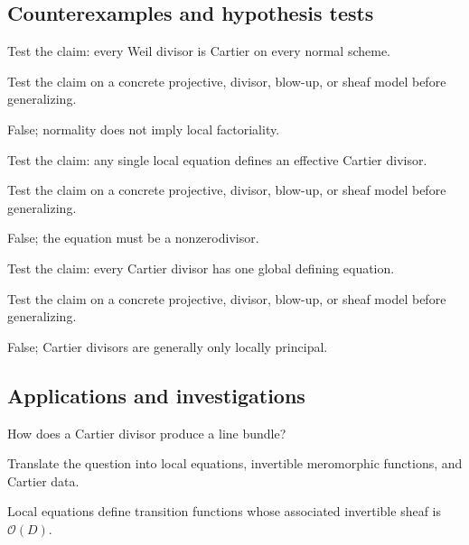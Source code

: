 \subsection*{Counterexamples and hypothesis tests}

\begin{exercise}\label{exr:vi40-expand-10}
Test the claim: every Weil divisor is Cartier on every normal scheme.
\end{exercise}
\begin{hint}
Test the claim on a concrete projective, divisor, blow-up, or sheaf model before generalizing.
\end{hint}
\begin{solution}
False; normality does not imply local factoriality.
\end{solution}

\begin{exercise}\label{exr:vi40-expand-11}
Test the claim: any single local equation defines an effective Cartier divisor.
\end{exercise}
\begin{hint}
Test the claim on a concrete projective, divisor, blow-up, or sheaf model before generalizing.
\end{hint}
\begin{solution}
False; the equation must be a nonzerodivisor.
\end{solution}

\begin{exercise}\label{exr:vi40-expand-12}
Test the claim: every Cartier divisor has one global defining equation.
\end{exercise}
\begin{hint}
Test the claim on a concrete projective, divisor, blow-up, or sheaf model before generalizing.
\end{hint}
\begin{solution}
False; Cartier divisors are generally only locally principal.
\end{solution}

\subsection*{Applications and investigations}

\begin{exercise}\label{exr:vi40-expand-13}
How does a Cartier divisor produce a line bundle?
\end{exercise}
\begin{hint}
Translate the question into local equations, invertible meromorphic functions, and Cartier data.
\end{hint}
\begin{solution}
Local equations define transition functions whose associated invertible sheaf is $\mathcal O(D)$.
\end{solution}


